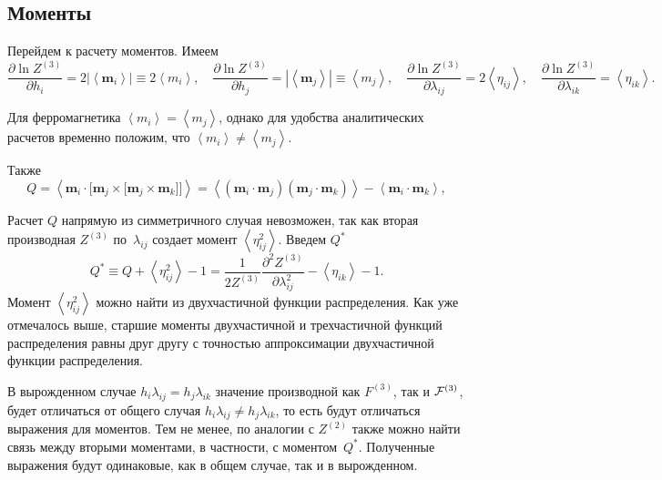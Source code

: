 \documentclass[12pt]{article}
\def\m{\mathbf m{}}
\def\sr#1{\left<#1\right>}
\def\ZV{Z^{(2)}}
\def\ZW{Z^{(3)}}
\def\FW{F^{(3)}}
\def\cFW{{\cal F}^{(3)}}
\begin{document}
\subsection*{Моменты}
Перейдем к расчету моментов. Имеем
\begin{equation}\label{moments::diff::Z3}
    \frac{\partial \ln \ZW}{\partial h_i} = 2|\sr{\m_i}| \equiv 2\sr{m_i}, \quad \frac{\partial \ln \ZW}{\partial h_j} = |\sr{\m_j}| \equiv \sr{m_j}, \quad \frac{\partial \ln \ZW}{\partial \lambda_{ij}} = 2\sr{\eta_{ij}}, \quad \frac{\partial \ln \ZW}{\partial \lambda_{ik}} = \sr{\eta_{ik}}.
\end{equation}

Для ферромагнетика $\sr{m_i} = \sr{m_j}$, однако для удобства аналитических расчетов временно положим, что $\sr{m_i} \neq \sr{m_j}$.

Также
\begin{equation}
    Q = \sr{\m_i\cdot\Big[\m_j\times\big[\m_j\times\m_k\big]\Big]} = \sr{(\m_i\cdot\m_j)(\m_j\cdot\m_k)} - \sr{\m_i\cdot\m_k},
\end{equation}

Расчет $Q$ напрямую из симметричного случая невозможен, так как вторая производная $\ZW$ по~$\lambda_{ij}$ создает момент $\sr{\eta_{ij}^2}$. Введем $Q^*$
\begin{equation}\label{def::Q_star}
    Q^* \equiv Q + \sr{\eta_{ij}^2} - 1 = \frac{1}{2\ZW}\frac{\partial^2\ZW}{\partial\lambda_{ij}^2} - \sr{\eta_{ik}} - 1.
\end{equation}
Момент $\sr{\eta_{ij}^2}$ можно найти из двухчастичной функции распределения. Как уже отмечалось выше, старшие моменты двухчастичной и трехчастичной функций распределения равны друг другу с точностью аппроксимации двухчастичной функции распределения.

В вырожденном случае $h_i\lambda_{ij} = h_j\lambda_{ik}$ значение производной как $\FW$, так и $\cFW$, будет отличаться от общего случая $h_i\lambda_{ij} \neq h_j\lambda_{ik}$, то есть будут отличаться выражения для моментов. Тем не менее, по аналогии с $\ZV$ также можно найти связь между вторыми моментами, в частности, с моментом~$Q^*$. Полученные выражения будут одинаковые, как в общем случае, так и в вырожденном.
\end{document}

